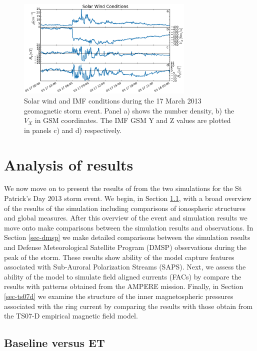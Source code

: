 \documentclass[draft,jgrga]{agutex}
\begin{document}
\begin{article}
\begin{figure}
\noindent\includegraphics[width=20pc]{JGRPaper-SWFig.pdf}
\caption{\label{sw-fig} 
Solar wind and IMF conditions during the 17 March 2013 geomagnetic storm event.  Panel a) shows the number density, b) the $V_X$ in GSM coordinates.  The IMF GSM Y and Z values are plotted in panels c) and d) respectively.} 
\end{figure}

\section{Analysis of results}
\label{sec-analysis}
We now move on to present the results of from the two simulations for the St Patrick's Day 2013 storm event.  We begin, in Section \ref{sec-comp}, with a broad overview of the results of the simulation including comparisons of ionospheric structures and global measures.  After this overview of the event and simulation results we move onto make comparisons between the simulation results and observations.  In Section \ref{sec-dmsp} we make detailed comparisons between the simulation results and Defense Meteorological Satellite Program (DMSP) observations during the peak of the storm.  These results show ability of the model capture features associated with Sub-Auroral Polarization Streams (SAPS).  Next, we assess the ability of the model to simulate field aligned currents (FACs) by compare the results with patterns obtained from the AMPERE mission.  Finally, in Section \ref{sec-ts07d} we examine the structure of the inner magnetospheric pressures associated with the ring current by comparing the results with those obtain from the TS07-D empirical magnetic field model.

\subsection{Baseline versus ET}
\label{sec-comp}


\end{article}
\end{document}
